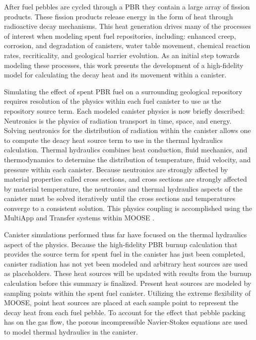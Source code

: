 \documentclass{anstrans}
\begin{document}
After fuel pebbles are cycled through a PBR they contain a large array of fission products.
These fission products release energy in the form of heat through radioactive decay mechanisms.
This heat generation drives many of the processes of interest when modeling spent fuel repositories, including: enhanced creep, corrosion, and degradation of canisters, water table movement, chemical reaction rates, recriticality, and geological barrier evolution.
As an initial step towards modeling these processes, this work presents the development of a high-fidelity model for calculating the decay heat and its movement within a canister.

Simulating the effect of spent PBR fuel on a surrounding geological repository requires resolution of the physics within each fuel canister to use as the repository source term.
Each modeled canister physics is now briefly described: Neutronics is the physics of radiation transport in time, space, and energy.
Solving neutronics for the distribution of radiation within the canister allows one to compute the deacy heat source term to use in the thermal hydraulics calculation.
Thermal hydraulics combines heat conduction, fluid mechanics, and thermodynamics to determine the distribution of temperature, fluid velocity, and pressure within each canister.
Because neutronics are strongly affected by material properties called cross sections, and cross sections are strongly affected by material temperature, the neutronics and thermal hydraulics aspects of the canister must be solved iteratively until the cross sections and temperatures converge to a consistent solution.
This physics coupling is accomplished using the MultiApp and Transfer systems within MOOSE \cite{multiapp}.

Canister simulations performed thus far have focused on the thermal hydraulics aspect of the physics.
Because the high-fidelity PBR burnup calculation that provides the source term for spent fuel in the canister has just been completed, canister radiation has not yet been modeled and arbitrary heat sources are used as placeholders.
These heat sources will be updated with results from the burnup calculation before this summary is finalized.
Present heat sources are modeled by sampling points within the spent fuel canister.
Utilizing the extreme flexibility of MOOSE, point heat sources are placed at each sample point to represent the decay heat from each fuel pebble.
To account for the effect that pebble packing has on the gas flow, the porous incompressible Navier-Stokes equations are used to model thermal hydraulics in the canister.
\end{document}
